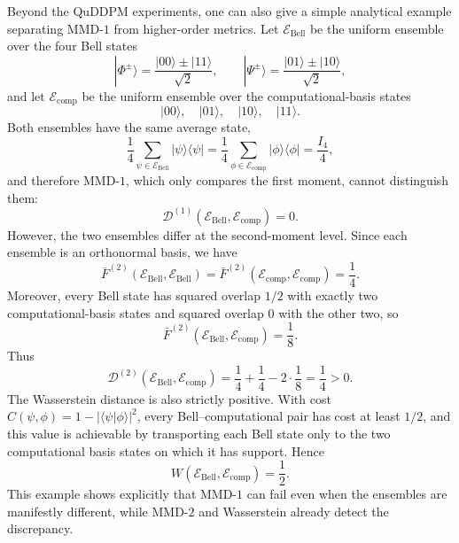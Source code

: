 \documentclass[aps,prx,reprint,superscriptaddress,amsmath,amssymb,longbibliography,floatfix]{revtex4-2}
\newcommand{\abs}[1]{\lvert #1\rvert}
\providecommand{\ket}[1]{|#1 \rangle}
\providecommand{\braket}[2]{\langle #1|#2 \rangle}
\providecommand{\ketbra}[2]{|#1\rangle \langle #2|}
\newcommand{\scD}{\mathcal{D}}
\newcommand{\scE}{\mathcal{E}}
\theoremstyle{plain}
\theoremstyle{definition}
\theoremstyle{remark}
\begin{document}
Beyond the QuDDPM experiments, one can also give a simple analytical example separating
MMD-\(1\) from higher-order metrics. Let \(\scE_{\mathrm{Bell}}\) be the uniform ensemble over the
four Bell states
\[
    \ket{\Phi^\pm}
    =
    \frac{\ket{00}\pm\ket{11}}{\sqrt2},
    \qquad
    \ket{\Psi^\pm}
    =
    \frac{\ket{01}\pm\ket{10}}{\sqrt2},
\]
and let \(\scE_{\mathrm{comp}}\) be the uniform ensemble over the computational-basis states
\[
    \ket{00},\quad \ket{01},\quad \ket{10},\quad \ket{11}.
\]
Both ensembles have the same average state,
\[
    \frac14\sum_{\psi\in\scE_{\mathrm{Bell}}}\ketbra{\psi}{\psi}
    =
    \frac14\sum_{\phi\in\scE_{\mathrm{comp}}}\ketbra{\phi}{\phi}
    =
    \frac{I_4}{4},
\]
and therefore MMD-\(1\), which only compares the first moment, cannot distinguish them:
\begin{equation}
    \scD^{(1)}(\scE_{\mathrm{Bell}},\scE_{\mathrm{comp}})=0.
\label{eq:app-bell-computational-mmd-one}
\end{equation}
However, the two ensembles differ at the second-moment level. Since each ensemble is an
orthonormal basis, we have
\[
    \bar F^{(2)}(\scE_{\mathrm{Bell}},\scE_{\mathrm{Bell}})
    =
    \bar F^{(2)}(\scE_{\mathrm{comp}},\scE_{\mathrm{comp}})
    =
    \frac14.
\]
Moreover, every Bell state has squared overlap \(1/2\) with exactly two computational-basis
states and squared overlap \(0\) with the other two, so
\[
    \bar F^{(2)}(\scE_{\mathrm{Bell}},\scE_{\mathrm{comp}})
    =
    \frac18.
\]
Thus
\begin{equation}
    \scD^{(2)}(\scE_{\mathrm{Bell}},\scE_{\mathrm{comp}})
    =
    \frac14+\frac14-2\cdot\frac18
    =
    \frac14>0.
\label{eq:app-bell-computational-mmd-two}
\end{equation}
The Wasserstein distance is also strictly positive. With cost
\(C(\psi,\phi)=1-\abs{\braket{\psi}{\phi}}^2\), every Bell--computational pair has cost at least
\(1/2\), and this value is achievable by transporting each Bell state only to the two computational
basis states on which it has support. Hence
\begin{equation}
    W(\scE_{\mathrm{Bell}},\scE_{\mathrm{comp}})
    =
    \frac12.
\label{eq:app-bell-computational-wasserstein}
\end{equation}
This example shows explicitly that MMD-\(1\) can fail even when the ensembles are manifestly
different, while MMD-\(2\) and Wasserstein already detect the discrepancy.
\end{document}
